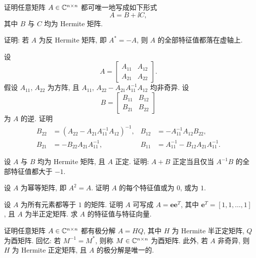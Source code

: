 \begin{exercises}
\item 证明任意矩阵 $A\in\mathbb{C}^{n\times n}$ 都可唯一地写成如下形式
  \[
    A=B+\ii C,
  \]
  其中 $B$ 与 $C$ 均为 Hermite 矩阵.

\item 证明: 若 $A$ 为反 Hermite 矩阵, 即 $A^{*}=-A$, 则 $A$ 的全部特征值都落在虚轴上.

\item 设
  \[
    A=\begin{bmatrix} A_{11} & A_{12}\\ A_{21} & A_{22}\end{bmatrix}.
  \]
  假设 $A_{11}$, $A_{22}$ 为方阵, 且 $A_{11}$, $A_{22}-A_{21}A_{11}^{-1}A_{12}$ 均非奇异. 设
  \[
    B=\begin{bmatrix} B_{11} & B_{12}\\ B_{21} & B_{22}\end{bmatrix}
  \]
  为 $A$ 的逆. 证明
  \begin{align*}
    B_{22}&=(A_{22}-A_{21}A_{11}^{-1}A_{12})^{-1}, &
    B_{12}&=-A_{11}^{-1}A_{12}B_{22},\\
    B_{21}&=-B_{22}A_{21}A_{11}^{-1}, &
    B_{11}&=A_{11}^{-1}-B_{12}A_{21}A_{11}^{-1}.
  \end{align*}

\item 设 $A$ 与 $B$ 均为 Hermite 矩阵, 且 $A$ 正定. 证明: $A+B$ 正定当且仅当 $A^{-1}B$ 的全部特征值都大于 $-1$.

\item 设 $A$ 为幂等矩阵, 即 $A^{2}=A$. 证明 $A$ 的每个特征值或为 $0$, 或为 $1$.

\item 设 $A$ 为所有元素都等于 $1$ 的矩阵. 证明 $A$ 可写成 $A=\mathbf{e}\mathbf{e}^{T}$, 其中 $\mathbf{e}^{T}=[1,1,\ldots,1]$, 且 $A$ 为半正定矩阵. 求 $A$ 的特征值与特征向量.

\item 证明任意矩阵 $A\in\mathbb{C}^{n\times n}$ 都有极分解 $A=HQ$, 其中 $H$ 为 Hermite 半正定矩阵, $Q$ 为酉矩阵. 回忆: 若 $M^{-1}=M^{*}$, 则称 $M\in\mathbb{C}^{n\times n}$ 为酉矩阵. 此外, 若 $A$ 非奇异, 则 $H$ 为 Hermite 正定矩阵, 且 $A$ 的极分解是唯一的.

\end{exercises}
